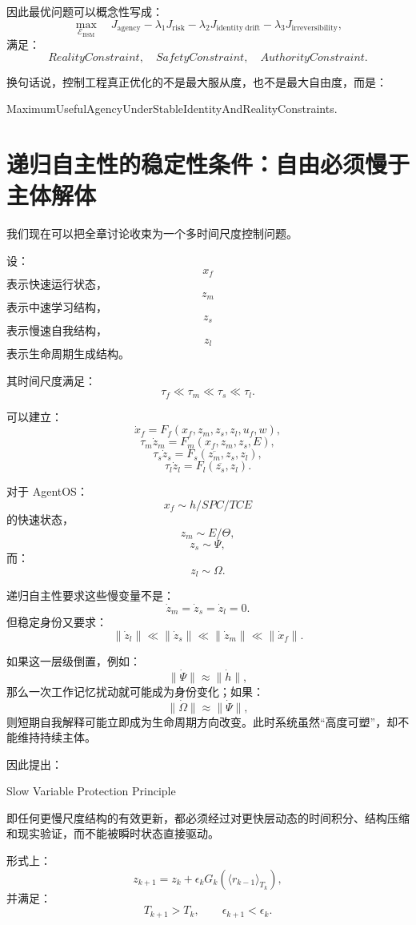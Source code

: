 因此最优问题可以概念性写成：
\[
\max_{\mathcal E_{\mathrm{BSM}}}
\quad
J_{\mathrm{agency}}
-
\lambda_1J_{\mathrm{risk}}
-
\lambda_2J_{\mathrm{identity\ drift}}
-
\lambda_3J_{\mathrm{irreversibility}},
\]
满足：
\[
RealityConstraint,
\quad
SafetyConstraint,
\quad
AuthorityConstraint.
\]

换句话说，控制工程真正优化的不是最大服从度，也不是最大自由度，而是：
\begin{statementbox}
MaximumUsefulAgencyUnderStableIdentityAndRealityConstraints.
\end{statementbox}

\section{递归自主性的稳定性条件：自由必须慢于主体解体}

我们现在可以把全章讨论收束为一个多时间尺度控制问题。

设：
\[
x_f
\]
表示快速运行状态，
\[
z_m
\]
表示中速学习结构，
\[
z_s
\]
表示慢速自我结构，
\[
z_l
\]
表示生命周期生成结构。

其时间尺度满足：
\[
\tau_f
\ll
\tau_m
\ll
\tau_s
\ll
\tau_l.
\]

可以建立：
\[
\dot x_f
=
F_f(
x_f,z_m,z_s,z_l,u_f,w
),
\]
\[
\tau_m\dot z_m
=
F_m(
x_f,z_m,z_s,E
),
\]
\[
\tau_s\dot z_s
=
F_s(
\overline{z_m},z_s,z_l
),
\]
\[
\tau_l\dot z_l
=
F_l(
\overline{z_s},z_l
).
\]

对于 AgentOS：
\[
x_f\sim h/SPC/TCE
\]
的快速状态，
\[
z_m\sim E/\Theta,
\]
\[
z_s\sim\Psi,
\]
而：
\[
z_l\sim\Omega.
\]

递归自主性要求这些慢变量不是：
\[
\dot z_m
=
\dot z_s
=
\dot z_l
=
0.
\]
但稳定身份又要求：
\[
\boxed{
\|\dot z_l\|
\ll
\|\dot z_s\|
\ll
\|\dot z_m\|
\ll
\|\dot x_f\|.
}
\]

如果这一层级倒置，例如：
\[
\|\dot\Psi\|
\approx
\|\dot h\|,
\]
那么一次工作记忆扰动就可能成为身份变化；如果：
\[
\|\dot\Omega\|
\approx
\|\dot\Psi\|,
\]
则短期自我解释可能立即成为生命周期方向改变。此时系统虽然“高度可塑”，却不能维持持续主体。

因此提出：

\begin{statementbox}
Slow Variable Protection Principle
\end{statementbox}

即任何更慢尺度结构的有效更新，都必须经过对更快层动态的时间积分、结构压缩和现实验证，而不能被瞬时状态直接驱动。

形式上：
\[
z_{k+1}
=
z_k
+
\epsilon_k
G_k(
\langle r_{k-1}\rangle_{T_k}
),
\]
并满足：
\[
T_{k+1}
>
T_k,
\qquad
\epsilon_{k+1}
<
\epsilon_k.
\]

